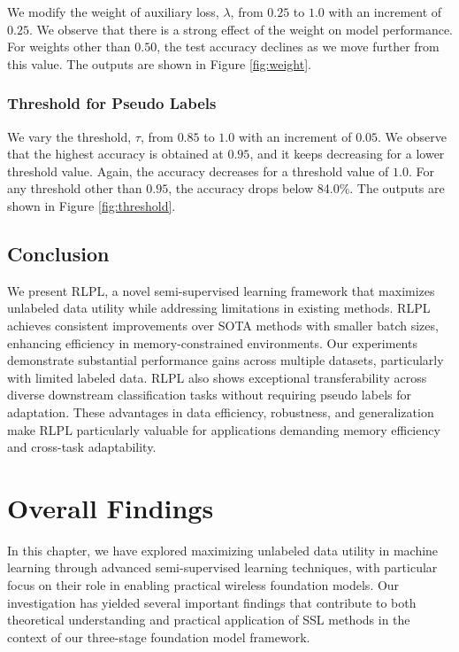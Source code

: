 We modify the weight of auxiliary loss, $\lambda$, from $0.25$ to $1.0$ with an increment of $0.25$. We observe that there is a strong effect of the weight on model performance. For weights other than $0.50$, the test accuracy declines as we move further from this value. The outputs are shown in Figure \ref{fig:weight}.

\subsubsection{Threshold for Pseudo Labels}

We vary the threshold, $\tau$, from $0.85$ to $1.0$ with an increment of $0.05$. We observe that the highest accuracy is obtained at $0.95$, and it keeps decreasing for a lower threshold value. Again, the accuracy decreases for a threshold value of $1.0$. For any threshold other than $0.95$, the accuracy drops below 84.0\%. The outputs are shown in Figure \ref{fig:threshold}.

\subsection{Conclusion}

We present RLPL, a novel semi-supervised learning framework that maximizes unlabeled data utility while addressing limitations in existing methods. RLPL achieves consistent improvements over SOTA methods with smaller batch sizes, enhancing efficiency in memory-constrained environments. Our experiments demonstrate substantial performance gains across multiple datasets, particularly with limited labeled data. RLPL also shows exceptional transferability across diverse downstream classification tasks without requiring pseudo labels for adaptation. These advantages in data efficiency, robustness, and generalization make RLPL particularly valuable for applications demanding memory efficiency and cross-task adaptability.

\section{Overall Findings}

In this chapter, we have explored maximizing unlabeled data utility in machine learning through advanced semi-supervised learning techniques, with particular focus on their role in enabling practical wireless foundation models. Our investigation has yielded several important findings that contribute to both theoretical understanding and practical application of SSL methods in the context of our three-stage foundation model framework.

